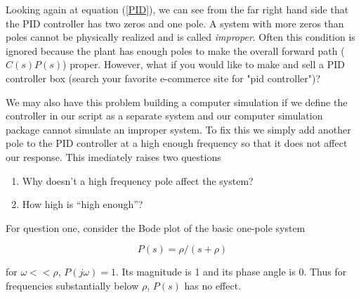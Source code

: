 %
%


Looking again at equation (\ref{PID}), we can see from the far right hand side that the PID controller has two zeros and one pole.   A system with more zeros than poles cannot be physically realized and is called {\it improper}.   Often this condition is ignored because the plant has enough poles to make the overall forward path ($C(s)P(s)$) proper.  However, what if you would like to make and sell a PID controller box
(search your favorite e-commerce site for "pid controller")?

We may also have this problem building a computer simulation if we define the controller in our script as a separate system and our computer simulation package    cannot simulate an improper system.
To fix this we simply add another pole to the PID controller at a high enough frequency so that it does not affect our response.  This imediately raises two questions




\begin{enumerate}
  \item Why doesn't a high frequency pole affect the system?
  \item How high is ``high enough''?
\end{enumerate}






For question one, consider the Bode plot of the basic one-pole system	%


\[
P(s) = \rho/(s+\rho)
\]

for $\omega << \rho$, $P(j\omega) = 1$.  Its magnitude is 1 and its phase angle is 0.
Thus for frequencies substantially below $\rho$, $P(s)$ has no effect.	%





